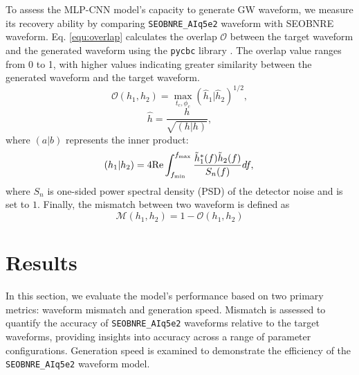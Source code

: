 \documentclass[
reprint,
superscriptaddress,
amsmath,amssymb,
aps,
prd,
floatfix,
]{revtex4-2}
\begin{document}
To assess the MLP-CNN model's capacity to generate GW  waveform, we measure its recovery ability by comparing \texttt{SEOBNRE\_AIq5e2} waveform with SEOBNRE waveform.
Eq. \ref{equ:overlap} calculates the overlap $\mathcal{O}$ between the target waveform and the generated waveform using the \texttt{pycbc} library \cite{alex_nitz_2024_10473621}. The overlap value ranges from 0 to 1, with higher values indicating greater similarity between the generated waveform and the target waveform.
    \begin{equation}
        \mathcal{O}({h}_1, {h}_2)=
        \max_{t_c, \phi_c}\left(\hat{h}_1|\hat{h}_2\right)^{1/2} ,
        \label{equ:overlap}
    \end{equation}
    \begin{equation}
        \hat{h} = \frac{h}{\sqrt{(h|h)}},
    \end{equation}
where $(a|b)$ represents the inner product:
    \begin{equation}
        (h_1|h_2) =4\text{Re}\int_{f_{\min}}^{f_{\max}}\frac{\tilde{h}^*_1(f)\tilde{h}_2(f)}{S_n(f)}df, \\
            \label{equ:inner}
    \end{equation}
where $S_n$ is one-sided power spectral density (PSD) of the detector noise and is set to $1$. Finally, the mismatch between two waveform is defined as
\begin{equation}
    \mathcal{M}({h}_{1}, {h}_2) = 1-\mathcal{O}({h}_1, {h}_2)
    \label{equ:mismatch}
\end{equation}



\section{Results}
\label{sec:res}
In this section, we evaluate the model’s performance based on two primary metrics: waveform mismatch and generation speed. Mismatch is assessed to quantify the accuracy of \texttt{SEOBNRE\_AIq5e2} waveforms relative to the target waveforms, providing insights into accuracy across a range of parameter configurations. 
Generation speed is examined to demonstrate the efficiency of the \texttt{SEOBNRE\_AIq5e2} waveform model.
\end{document}
